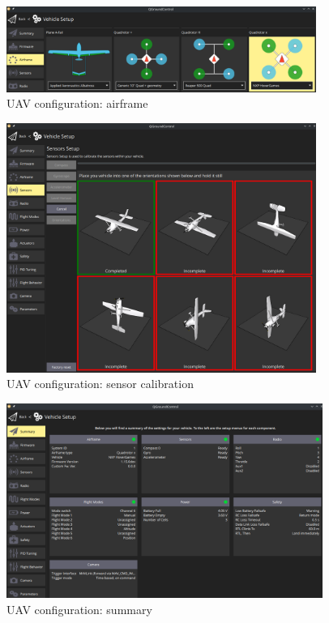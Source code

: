 \begin{figure}[!hbt]
  \centering
  \includegraphics[width=0.9\textwidth]{./img/png/qgc-airframe}
  \caption{UAV configuration: airframe}
  \label{fig:uav-cfg-airframe}
\end{figure}

\begin{figure}[!hbt]
  \centering
  \includegraphics[width=0.9\textwidth]{./img/png/qgc-sensors}
  \caption{UAV configuration: sensor calibration}
  \label{fig:uav-cfg-sensors}
\end{figure}

\begin{figure}[!hbt]
  \centering
  \includegraphics[width=0.92\textwidth]{./img/png/qgc-summary}
  \caption{UAV configuration: summary}
  \label{fig:uav-cfg-summary}
\end{figure}

